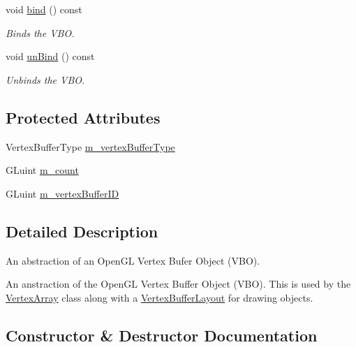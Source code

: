 \begin{DoxyCompactItemize}
void \hyperlink{class_cookie_eng_1_1_graphics_1_1_vertex_buffer_a6fbaa64c5edeb00d4f5770587eb7b369}{bind} () const
\begin{DoxyCompactList}\small\item\em Binds the V\+BO. \end{DoxyCompactList}\item 
void \hyperlink{class_cookie_eng_1_1_graphics_1_1_vertex_buffer_a8fbc3f39762c511438bc13e8c405926c}{un\+Bind} () const
\begin{DoxyCompactList}\small\item\em Unbinds the V\+BO. \end{DoxyCompactList}\end{DoxyCompactItemize}
\subsection*{Protected Attributes}
\begin{DoxyCompactItemize}
\item 
Vertex\+Buffer\+Type \hyperlink{class_cookie_eng_1_1_graphics_1_1_vertex_buffer_a37d75d306f50db1b63c22b51912402cc}{m\+\_\+vertex\+Buffer\+Type}
\item 
G\+Luint \hyperlink{class_cookie_eng_1_1_graphics_1_1_vertex_buffer_a280a08a319717cf425435efd9b912ef3}{m\+\_\+count}
\item 
G\+Luint \hyperlink{class_cookie_eng_1_1_graphics_1_1_vertex_buffer_af4c00fbd9352dd8a0b5952c007037e2e}{m\+\_\+vertex\+Buffer\+ID}
\end{DoxyCompactItemize}


\subsection{Detailed Description}
An abstraction of an Open\+GL Vertex Bufer Object (V\+BO). 

An anstraction of the Open\+GL Vertex Buffer Object (V\+BO). This is used by the \hyperlink{class_cookie_eng_1_1_graphics_1_1_vertex_array}{Vertex\+Array} class along with a \hyperlink{class_cookie_eng_1_1_graphics_1_1_vertex_buffer_layout}{Vertex\+Buffer\+Layout} for drawing objects. 

\subsection{Constructor \& Destructor Documentation}
\mbox{\label{class_cookie_eng_1_1_graphics_1_1_vertex_buffer_ac877c409fdb8a09947bb13664b78a335}} 
